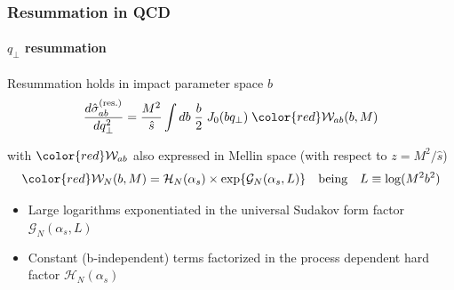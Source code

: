 \documentclass[aspectratio=43]{beamer}
\begin{document}
\begin{frame}
	
	\frametitle{Resummation in QCD}
	\framesubtitle{$q_{\perp}$ resummation}
	
	\footnotesize Resummation holds in impact parameter space $b$
	\begin{equation}
	\frac{d\hat{\sigma}_{ab}^{\textrm{(res.)}}}{dq_{\perp}^{2}} = \frac{M^{2}}{\hat{s}} \int db \; \frac{b}{2} \; J_{0}(b q_{\perp}) \; {\color{red} \mathcal{W}_{ab}(b, M)} \nonumber
	\end{equation}
	
	\footnotesize 
	with ${\color{red}\mathcal{W}_{ab}}$ also expressed in Mellin space (with respect to $z = M^{2}/\hat{s}$)
	\begin{equation}
	{\color{red} \mathcal{W}_{N}(b, M) = \mathcal{H}_{N}(\alpha_{s}) \times \exp\{\mathcal{G}_{N}(\alpha_{s}, L)\}} \quad\textrm{being}\quad L \equiv \log(M^{2}b^{2}) \nonumber
	\end{equation}
	
	\begin{itemize}
		\item Large logarithms exponentiated in the universal Sudakov form factor {\color{red}$\mathcal{G}_{N}(\alpha_{s}, L)$}
		\item Constant (b-independent) terms factorized in the process dependent hard factor {\color{red}$\mathcal{H}_{N}(\alpha_{s})$}
	\end{itemize}

\end{frame}

%
%

\begin{frame}


\end{frame}
\end{document}
